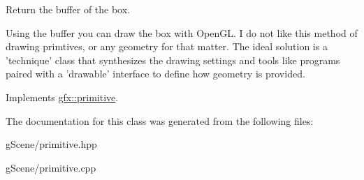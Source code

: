 Return the buffer of the box. 

Using the buffer you can draw the box with Open\-G\-L. I do not like this method of drawing primtives, or any geometry for that matter. The ideal solution is a 'technique' class that synthesizes the drawing settings and tools like programs paired with a 'drawable' interface to define how geometry is provided. 

Implements \hyperlink{classgfx_1_1primitive}{gfx\-::primitive}.



The documentation for this class was generated from the following files\-:\begin{DoxyCompactItemize}
\item 
g\-Scene/primitive.\-hpp\item 
g\-Scene/primitive.\-cpp\end{DoxyCompactItemize}
